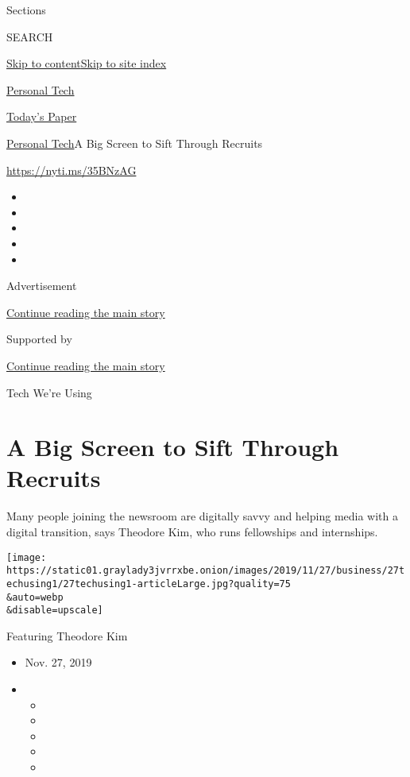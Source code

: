 Sections

SEARCH

\protect\hyperlink{site-content}{Skip to
content}\protect\hyperlink{site-index}{Skip to site index}

\href{https://www.nytimes3xbfgragh.onion/section/technology/personaltech}{Personal
Tech}

\href{https://myaccount.nytimes3xbfgragh.onion/auth/login?response_type=cookie\&client_id=vi}{}

\href{https://www.nytimes3xbfgragh.onion/section/todayspaper}{Today's
Paper}

\href{/section/technology/personaltech}{Personal Tech}\textbar{}A Big
Screen to Sift Through Recruits

\href{https://nyti.ms/35BNzAG}{https://nyti.ms/35BNzAG}

\begin{itemize}
\item
\item
\item
\item
\item
\end{itemize}

Advertisement

\protect\hyperlink{after-top}{Continue reading the main story}

Supported by

\protect\hyperlink{after-sponsor}{Continue reading the main story}

Tech We're Using

\hypertarget{a-big-screen-to-sift-through-recruits}{%
\section{A Big Screen to Sift Through
Recruits}\label{a-big-screen-to-sift-through-recruits}}

Many people joining the newsroom are digitally savvy and helping media
with a digital transition, says Theodore Kim, who runs fellowships and
internships.

\texttt{[image: https://static01.graylady3jvrrxbe.onion/images/2019/11/27/business/27techusing1/27techusing1-articleLarge.jpg?quality=75\\\&auto=webp\\\&disable=upscale]}

Featuring Theodore Kim

\begin{itemize}
\item
  Nov. 27, 2019
\item
  \begin{itemize}
  \item
  \item
  \item
  \item
  \item
  \end{itemize}
\end{itemize}

